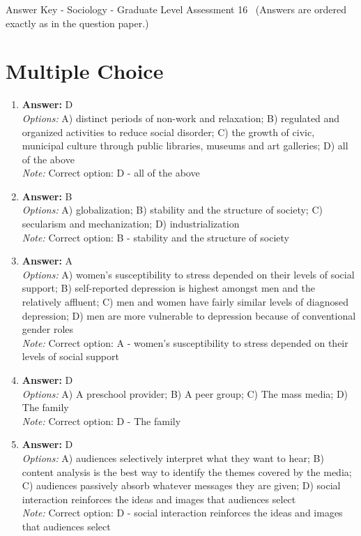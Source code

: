 \documentclass[12pt]{article}
\begin{document}
\begin{center}
Answer Key - Sociology - Graduate Level Assessment 16 \
\small (Answers are ordered exactly as in the question paper.)
\end{center}

\section*{Multiple Choice}
\begin{enumerate}[label=\arabic*.]
\item \textbf{Answer:} D
\\ \textit{Options:} A) distinct periods of non-work and relaxation; B) regulated and organized activities to reduce social disorder; C) the growth of civic, municipal culture through public libraries, museums and art galleries; D) all of the above
\\ \textit{Note:} Correct option: D - all of the above
\item \textbf{Answer:} B
\\ \textit{Options:} A) globalization; B) stability and the structure of society; C) secularism and mechanization; D) industrialization
\\ \textit{Note:} Correct option: B - stability and the structure of society
\item \textbf{Answer:} A
\\ \textit{Options:} A) women's susceptibility to stress depended on their levels of social support; B) self-reported depression is highest amongst men and the relatively affluent; C) men and women have fairly similar levels of diagnosed depression; D) men are more vulnerable to depression because of conventional gender roles
\\ \textit{Note:} Correct option: A - women's susceptibility to stress depended on their levels of social support
\item \textbf{Answer:} D
\\ \textit{Options:} A) A preschool provider; B) A peer group; C) The mass media; D) The family
\\ \textit{Note:} Correct option: D - The family
\item \textbf{Answer:} D
\\ \textit{Options:} A) audiences selectively interpret what they want to hear; B) content analysis is the best way to identify the themes covered by the media; C) audiences passively absorb whatever messages they are given; D) social interaction reinforces the ideas and images that audiences select
\\ \textit{Note:} Correct option: D - social interaction reinforces the ideas and images that audiences select
\end{enumerate}
\end{document}

